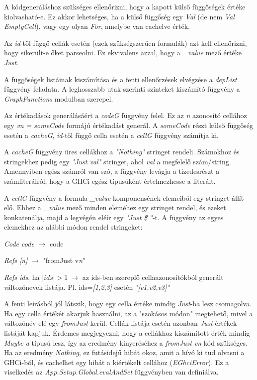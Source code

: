 A kódgeneráláshoz szükséges ellenőrizni, hogy a kapott külső függőségek értéke kiolvasható-e. Ez akkor lehetséges, ha a külső függőség egy \textit{Val} (de nem \textit{Val EmptyCell}), vagy egy olyan \textit{For}, amelybe van cachelve érték.

Az \textit{id}-től függő cellák esetén (ezek szükségszerűen formulák) azt kell ellenőrizni, hogy sikerült-e őket parseolni. Ez ekvivalens azzal, hogy a \textit{\_value} mező értéke \textit{Just}.

A függőségek listáinak kiszámítása és a fenti ellenőrzések elvégzése a \textit{depList} függvény feladata. A leghosszabb utak szerinti szinteket kiszámító függvény a \textit{GraphFunctions} modulban szerepel. 

Az értékadások generálásáért a \textit{codeG} függvény felel. Ez az \textit{n} azonosító cellához egy \textit{vn = someCode} formájú értékadást generál. A \textit{someCode} részt külső függőség esetén a \textit{cacheG}, \textit{id}-től függő cella esetén a \textit{cellG} függvény számítja ki.

A \textit{cacheG} függvény üres cellákhoz a \textit{"Nothing"} stringet rendeli. Számokhoz és stringekhez pedig egy \textit{"Just val"} stringet, ahol \textit{val} a megfelelő szám/string. Amennyiben egész számról van szó, a függvény levágja a tizedesrészt a számliterálról, hogy a GHCi egész típusúként értelmezhesse a literált.

A \textit{cellG} függvény a formula \textit{\_value} komponensének elemeiből egy stringet állít elő. Ehhez a \textit{\_value} mező minden eleméhez egy stringet rendel, és ezeket konkatenálja, majd a legvégén eléír egy \textit{"Just \$ "}-t. A függvény az egyes elemekhez az alábbi módon rendel stringeket:
\begin{compactenum}
	\item \textit{Code code} $\rightarrow$ code
	\item \textit{Refs [n]} $\rightarrow$ "fromJust v\textit{n}"
	\item \textit{Refs ids}, ha $|ids| > 1 \ \rightarrow$ az ids-ben szereplő cellaazonosítókból generált változónevek listája. Pl. ids=\textit{[1,2,3]} esetén \textit{"[v1,v2,v3]"}
\end{compactenum}

A fenti leírásból jól látszik, hogy egy cella értéke mindig \textit{Just}-ba lesz csomagolva. Ha egy cella értékét akarjuk használni, az a "szokásos módon" megtehető, mivel a változónév elé egy \textit{fromJust} kerül. Cellák listája esetén azonban \textit{Just} értékek listáját kapjuk. Érdemes megjegyezni, hogy a cellákhoz kiszámított érték mindig \textit{Maybe a} típusú lesz, így az eredmény kinyeréséhez a \textit{fromJust vn} kód szükséges. Ha az eredmény \textit{Nothing}, ez futásidejű hibát okoz, amit a hívó ki tud olvasni a GHCi-ból, és cachelhet egy hibát a kiértékelt cellához (\textit{EGhciError}). Ez a viselkedés az \textit{App.Setup.Global.evalAndSet} függvényben van definiálva.

